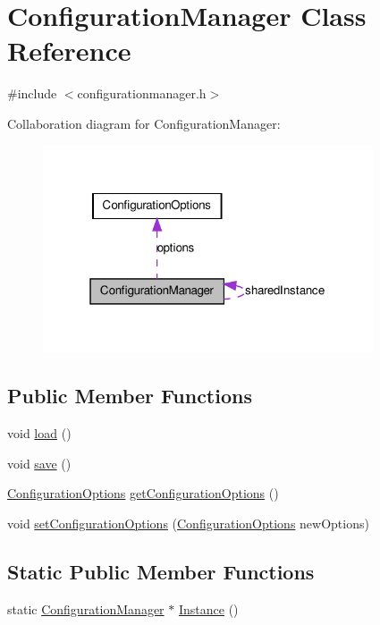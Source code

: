\hypertarget{class_configuration_manager}{
\section{ConfigurationManager Class Reference}
\label{class_configuration_manager}
}


{\ttfamily \#include $<$configurationmanager.h$>$}



Collaboration diagram for ConfigurationManager:\nopagebreak
\begin{figure}[H]
\begin{center}
\leavevmode
\includegraphics[width=277pt]{class_configuration_manager__coll__graph}
\end{center}
\end{figure}
\subsection*{Public Member Functions}
\begin{DoxyCompactItemize}
\item 
void \hyperlink{class_configuration_manager_ad4bcaee14bd62192b31af1735cf0da77}{load} ()
\item 
void \hyperlink{class_configuration_manager_a2ad213166283926fffb06da68ff781e9}{save} ()
\item 
\hyperlink{class_configuration_options}{ConfigurationOptions} \hyperlink{class_configuration_manager_afc52eab5f967588ed6cf98dbb8559783}{getConfigurationOptions} ()
\item 
void \hyperlink{class_configuration_manager_a194ca87842be1613ce98c02cbcffe680}{setConfigurationOptions} (\hyperlink{class_configuration_options}{ConfigurationOptions} newOptions)
\end{DoxyCompactItemize}
\subsection*{Static Public Member Functions}
\begin{DoxyCompactItemize}
\item 
static \hyperlink{class_configuration_manager}{ConfigurationManager} $\ast$ \hyperlink{class_configuration_manager_a578eaaaa5bf2494c2c87c92acb1026b0}{Instance} ()
\end{DoxyCompactItemize}


